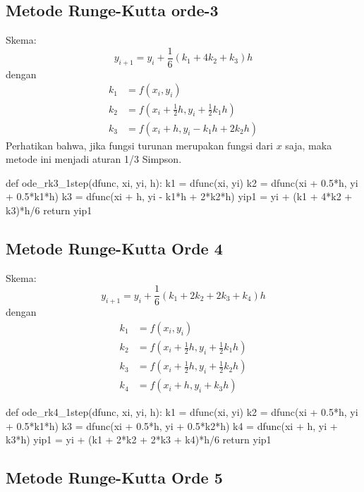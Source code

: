 \subsection{Metode Runge-Kutta orde-3}

Skema:
\begin{equation*}
y_{i+1} = y_i + \frac{1}{6}(k_1 + 4k_2 + k_3)h
\end{equation*}
dengan
\begin{align*}
k_1 & = f(x_i, y_i) \\
k_2 & = f(x_i + \frac{1}{2}h, y_i + \frac{1}{2} k_1 h ) \\
k_3 & = f(x_i + h, y_i - k_1 h + 2 k_2 h)
\end{align*}
Perhatikan bahwa, jika fungsi turunan merupakan fungsi dari $x$ saja, maka metode ini menjadi
aturan 1/3 Simpson.


\begin{pythoncode}
def ode_rk3_1step(dfunc, xi, yi, h):
    k1 = dfunc(xi, yi)
    k2 = dfunc(xi + 0.5*h, yi + 0.5*k1*h)
    k3 = dfunc(xi + h, yi - k1*h + 2*k2*h)
    yip1 = yi + (k1 + 4*k2 + k3)*h/6
    return yip1
\end{pythoncode}

\subsection{Metode Runge-Kutta Orde 4}

Skema:
\begin{equation*}
y_{i+1} = y_{i} + \frac{1}{6}(k_1 + 2k_2 + 2k_3 + k_4) h
\end{equation*}
dengan
\begin{align*}
k_1 & = f(x_i, y_i) \\
k_2 & = f\left( x_i + \frac{1}{2}h, y_i + \frac{1}{2} k_1 h \right) \\
k_3 & = f\left( x_i + \frac{1}{2}h, y_i + \frac{1}{2} k_2 h \right) \\
k_4 & = f(x_i + h, y_i + k_3 h)
\end{align*}

\begin{pythoncode}
def ode_rk4_1step(dfunc, xi, yi, h):
    k1 = dfunc(xi, yi)
    k2 = dfunc(xi + 0.5*h, yi + 0.5*k1*h)
    k3 = dfunc(xi + 0.5*h, yi + 0.5*k2*h)
    k4 = dfunc(xi + h, yi + k3*h)
    yip1 = yi + (k1 + 2*k2 + 2*k3 + k4)*h/6
    return yip1
\end{pythoncode}


\subsection{Metode Runge-Kutta Orde 5}

